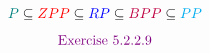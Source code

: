 
\begin{frame}
\end{frame}

\begin{frame}
  {\huge
	\[
	  \textcolor{teal}{P} \subseteq \textcolor{red}{ZPP} \subseteq \textcolor{blue}{RP} \subseteq \textcolor{purple}{BPP} \subseteq \textcolor{cyan}{PP}
	\]
  }

  \pause
  {\LARGE
	\[
	  \textcolor{violet}{\text{Exercise } 5.2.2.9}
	\]
  }
\end{frame}

